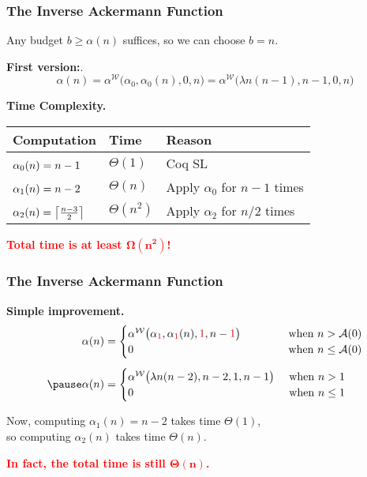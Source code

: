 \begin{frame}
\frametitle{The Inverse Ackermann Function}

Any budget $b \ge \alpha(n)$ suffices, so we can choose $b = n$.

\smallskip

\pause
\textbf{First version:}.
\pause
\begin{equation*}
\alpha(n) = \alpha^{\mathcal{W}}\big(\alpha_0, \alpha_0(n), 0, n\big)
= \alpha^{\mathcal{W}}\big(\lambda n(n - 1), n - 1, 0, n\big)
\end{equation*}

\pause
\textbf{Time Complexity.}

\vspace{5pt}

\begin{tabular}{l|l|l}
Computation & Time & Reason \\ \hline
$\topspace{2pt} \alpha_0(n) = n - 1$ & $\Theta(1)$ & Coq SL \\
$\topspace{2pt} \alpha_1(n) = n - 2$ & $\Theta(n)$ & Apply $\alpha_0$ for $n - 1$ times \\
$\topspace{2pt} \alpha_2(n) = \left \lceil \frac{n-3}{2} \right \rceil$ & $\Theta(n^2)$ & Apply $\alpha_2$ for $n/2$ times
\end{tabular}

\vspace{7pt}

\textcolor{red}{\textbf{Total time is at least $\mathbf{\Omega(n^2)}$!}}

\end{frame}


\begin{frame}
\frametitle{The Inverse Ackermann Function}

\textbf{Simple improvement.}
\pause
\begin{equation*}
\begin{aligned}
\alpha(n) & = \begin{cases}
\alpha^{\mathcal{W}}\big(\alpha_{{\color{red} 1}}, \alpha_{{\color{red} 1}}(n), {{\color{red} 1}}, n - {{\color{red} 1}}\big) & \hspace{3em}\text{ when } n > \Ack(0) \\
0 & \hspace{3em}\text{ when } n \le \Ack(0)
\end{cases} \\[5pt]
\pause \alpha(n) & = \begin{cases}
\alpha^{\mathcal{W}}\big(\lambda n(n - 2), n - 2, 1, n - 1\big) & \text{ when } n > 1 \\
0 & \text{ when } n \le 1
\end{cases}
\end{aligned}
\end{equation*}

\pause
Now, computing $\alpha_1(n) = n - 2$ takes time $\Theta(1)$,\\
so computing $\alpha_2(n)$ takes time $\Theta(n)$.

\bigskip
\pause
\textcolor{red}{\textbf{In fact, the total time is still $\mathbf{\Theta(n)}$.}}

\end{frame}


